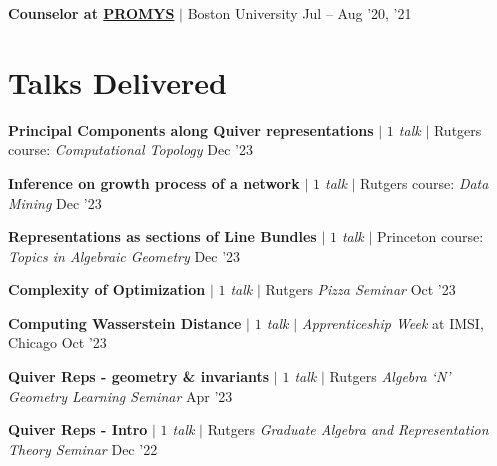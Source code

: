 \resumeProjectHeading
{\textbf{Counselor at \href{https://promys.org}{PROMYS}} $|$ Boston University }
{Jul -- Aug '20, '21}


\resumeSubHeadingListEnd



\section{Talks Delivered}
\resumeSubHeadingListStart

\resumeProjectHeading
{\textbf{Principal Components along Quiver representations} $|$ \emph{$1$ talk} $|$ Rutgers course: \textit {Computational Topology}}
{Dec '23}
{}
\vspace{\mygap}

\resumeProjectHeading
{\textbf{Inference on growth process of a network} $|$ \emph{$1$ talk} $|$ Rutgers course: \textit{Data Mining}}
{Dec '23}
{}
\vspace{\mygap}

\resumeProjectHeading
{\textbf{Representations as sections of Line Bundles} $|$ \emph{$1$ talk} $|$ Princeton course: \textit{Topics in Algebraic Geometry}}
{Dec '23}
{}
\vspace{\mygap}

\resumeProjectHeading
{\textbf{Complexity of Optimization} $|$ \emph{$1$ talk} $|$ Rutgers \textit{Pizza Seminar}}
{Oct '23}
{}
\vspace{\mygap}

\resumeProjectHeading
{\textbf{Computing Wasserstein Distance} $|$ \emph{$1$ talk} $|$ \textit{Apprenticeship Week} at IMSI, Chicago }
{Oct '23}
{}
\vspace{\mygap}



\resumeProjectHeading
{\textbf{Quiver Reps -  geometry \& invariants} $|$ \emph{$1$ talk} $|$ Rutgers \textit{Algebra `N' Geometry Learning Seminar}}
{Apr '23}
{}
\vspace{\mygap}

\resumeProjectHeading
{\textbf{Quiver Reps - Intro} $|$ \emph{$1$ talk} $|$ Rutgers \textit{Graduate Algebra and Representation Theory Seminar}}
{Dec '22}
{}
\vspace{\mygap}

